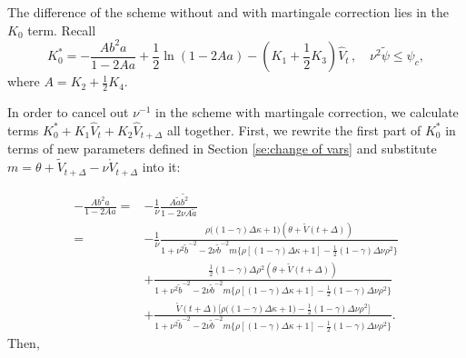 \documentclass{ws-ijfe}
\begin{document}
The difference of the scheme without and with martingale correction lies in the $K_0$ term. Recall
\begin{equation*}
  K_0^*= -\frac{Ab^2a}{1-2Aa}+\frac{1}{2}\ln(1-2Aa)-(K_1+\frac{1}{2}K_3)\hat{V}_t \,,\quad \nu^2\tilde{\psi}\leq \psi_c,
\end{equation*}
where $A=K_2+\frac{1}{2}K_4$.

 In order to cancel out $\nu^{-1}$ in the scheme with martingale correction, we calculate terms $K_0^*+K_1\hat{V}_t+K_2\hat{V}_{t+\Delta}$ all together. First, we rewrite the first part of $K_0^*$ in terms of new parameters defined in Section \ref{se:change of vars} and substitute $m=\theta+\tilde{V}_{t+\Delta}-\nu\mathring{V}_{t+\Delta}$ into it:

\begin{equation*}
\begin{split}
  -\frac{Ab^2a}{1-2Aa}=&-\frac{1}{\nu}\frac{A\tilde{a}\tilde{b^2}}{1-2\nu A\tilde{a}}\\
  =&-\frac{1}{\nu}\frac{\rho\big((1-\gamma)\Delta\kappa+1\big)(\theta+\tilde{V}(t+\Delta))}{1+\nu^2\tilde{b}^{-2}-2\nu\tilde{b}^{-2}m\{\rho[(1-\gamma)\Delta\kappa+1]-\frac{1}{2}(1-\gamma)\Delta\nu\rho^2\big\}}\\
  &+\frac{\frac{1}{2}(1-\gamma)\Delta\rho^2(\theta+\tilde{V}(t+\Delta))}{1+\nu^2\tilde{b}^{-2}-2\nu\tilde{b}^{-2}m\{\rho[(1-\gamma)\Delta\kappa+1]-\frac{1}{2}(1-\gamma)\Delta\nu\rho^2\big\}}\\
  &+\frac{\mathring{V}(t+\Delta)\big[\rho\big((1-\gamma)\Delta\kappa+1\big)-\frac{1}{2}(1-\gamma)\Delta\nu\rho^2\big]}{1+\nu^2\tilde{b}^{-2}-2\nu\tilde{b}^{-2}m\{\rho[(1-\gamma)\Delta\kappa+1]-\frac{1}{2}(1-\gamma)\Delta\nu\rho^2\big\}}.
\end{split}
\end{equation*}
Then,
\end{document}
